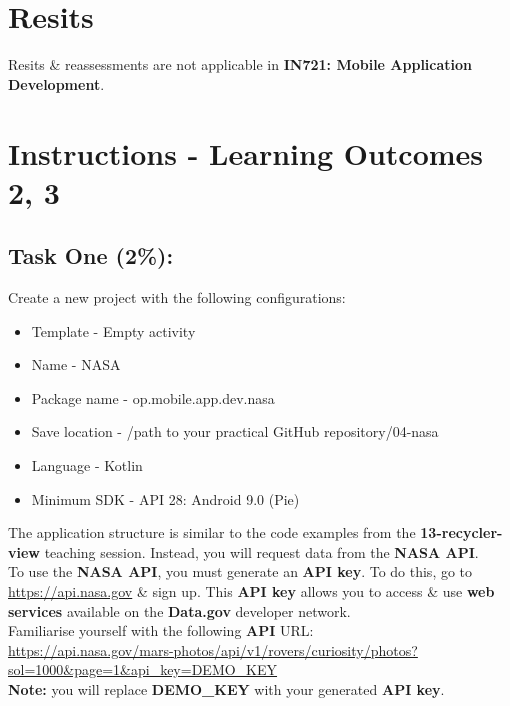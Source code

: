 \documentclass{article}
\begin{document}
\section*{Resits}
Resits \& reassessments are not applicable in \textbf{IN721: Mobile Application Development}.

\section*{Instructions - Learning Outcomes 2, 3}
\subsection*{Task One (2\%):}
Create a new project with the following configurations:
\begin{itemize}
	\item Template - Empty activity
	\item Name - NASA
	\item Package name - op.mobile.app.dev.nasa
	\item Save location - /path to your practical GitHub repository/04-nasa
	\item Language - Kotlin
	\item Minimum SDK - API 28: Android 9.0 (Pie) 
\end{itemize} 

The application structure is similar to the code examples from the \textbf{13-recycler-view} teaching session. Instead, you will request data from the \textbf{NASA API}. \\

To use the \textbf{NASA API}, you must generate an \textbf{API key}. To do this, go to \href{https://api.nasa.gov}{https://api.nasa.gov} \& sign up. This \textbf{API key} allows you to access \& use \textbf{web services} available on the \textbf{Data.gov} developer network. \\

Familiarise yourself with the following \textbf{API} URL: \\

\href{https://api.nasa.gov/mars-photos/api/v1/rovers/curiosity/photos?sol=1000\&page=1\&api\_key=DEMO\_KEY}{https://api.nasa.gov/mars-photos/api/v1/rovers/curiosity/photos?sol=1000\&page=1\&api\_key=DEMO\_KEY} \\

\textbf{Note:} you will replace \textbf{DEMO\_KEY} with your generated \textbf{API key}. \\
\end{document}
